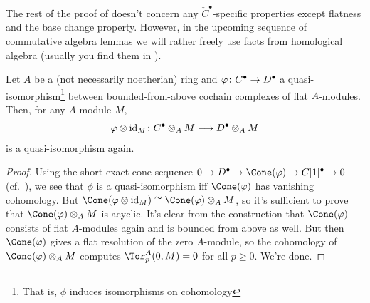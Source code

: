 \documentclass[a4paper,parskip=half,numbers=enddot, DIV=12]{scrreprt}
\renewcommand{\geq}{\geqslant}
\begin{document}
	The rest of the proof of  doesn't concern any $\check{C}^\bullet$-specific properties except flatness and the base change property. However, in the upcoming sequence of commutative algebra lemmas we will rather freely use facts from homological algebra (usually you find them in \cite{homalg}).
	\begin{lem}
		Let $A$ be a (not necessarily noetherian) ring and $\phi\colon C^\bullet\morphism D^\bullet$ a quasi-isomorphism\footnote{That is, $\phi$ induces isomorphisms on cohomology} between bounded-from-above cochain complexes of flat $A$-modules. Then, for any $A$-module $M$,
		\begin{align*}
			\phi\otimes\id_M\colon C^\bullet\otimes_AM\morphism D^\bullet\otimes_AM
		\end{align*}
		is a quasi-isomorphism again.
	\end{lem}
\begin{proof}
	Using the short exact cone sequence $0\morphism D^\bullet \morphism\Cone(\phi)\morphism C[1]^\bullet\morphism 0$ (cf.\ \cite[Definition~2.1.1]{alggeo2}), we see that $\phi$ is a quasi-isomorphism iff $\Cone(\phi)$ has vanishing cohomology. But $\Cone(\phi\otimes\id_M)\cong \Cone(\phi)\otimes_AM$, so it's sufficient to prove that $\Cone(\phi)\otimes_AM$ is acyclic. It's clear from the construction that $\Cone(\phi)$ consists of flat $A$-modules again and is bounded from above as well. But then $\Cone(\phi)$ gives a flat resolution of the zero $A$-module, so the cohomology of $\Cone(\phi)\otimes_AM$ computes $\Tor_p^A(0,M)=0$ for all $p\geq 0$. We're done.
\end{proof}
\end{document}
